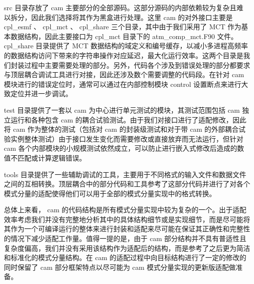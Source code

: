 src 目录存放了 cam 主要部分的全部源码。这部分源码的内部依赖较为复杂且难以拆分，因此我们选择将其作为黑盒进行处理。这里 cam 的对外接口主要是 cpl\_esmf 、 cpl\_mct 、 cpl\_share 三个目录，其中由于我们采用了 MCT 作为基本数据结构，因此主要接口为 cpl\_mct 目录下的 atm\_comp\_mct.F90 文件。 cpl\_share 目录提供了 MCT 数据结构的域定义和编号缓存，以减小多进程高频率的数据结构访问下带来的字符串操作对应延迟，最大化运行效率。这两个目录是我们封装过程中主要需要处理的部分。另外，代码各个涉及到错误处理的部分都要求与顶层耦合调试工具进行对接，因此还涉及数个需要调整的代码段。在针对 cam 模块进行的错误定位时，通常可以通过在内部控制模块 control 设置断点来进行大致定位并进一步调试。

test 目录提供了一套以 cam 为中心进行单元测试的模块，其测试范围包括 cam 独立运行和各种包含 cam 的耦合试验测试。由于我们对接口进行了适配修改，因此将 cam 作为整体的测试（包括对 cam 的封装级测试和对于带 cam 的外部耦合试验实例整体测试）由于接口发生变化而需要修改或直接放弃而无法运行，但针对 cam 各个内部模块的小规模测试依然成立，可以防止进行嵌入式修改后造成的数值不匹配或计算逻辑错误。

tools 目录提供了一些辅助调试的工具，主要用于不同格式的输入文件和数据文件之间的互相转换。顶层耦合中的部分代码和工具参考了这部分代码并进行了对各个模式分量的适配使得他们可以用于全部的模式分量实现中的格式转换。

总体上来看， cam 的代码结构是所有模式分量实现中较为复杂的一个。出于适配效率考虑我们并没有完整地分析其中的具体结构细节或是实现细节，而是尽可能将其作为一个可编译运行的整体来进行封装和适配来尽可能在保证其正确性和完整性的情况下减少适配工作量。值得一提的是，由于 cam 部分结构并不具有普适性且复杂度偏高，我们并没有采用该结构作为适配后的结构，而是参考了之后更为简洁和标准化的模式分量结构。在 cam 的适配过程中向目标结构进行了一定的修改的同时保留了 cam 部分框架特点以尽可能为 cam 模式分量实现的更新版适配做准备。

